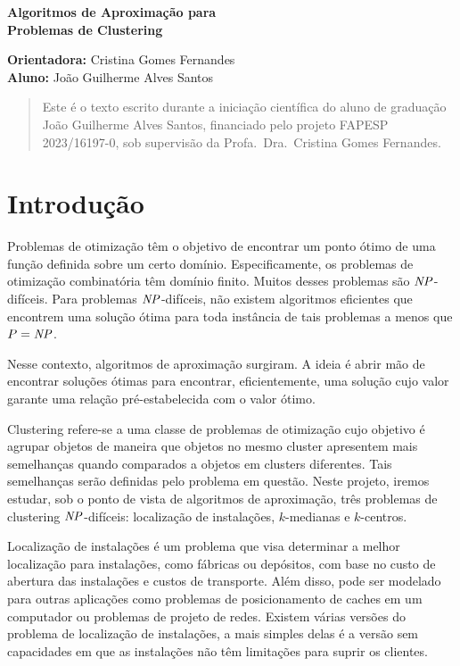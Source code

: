 \documentclass[12pt]{article}
\begin{document}
\begin{center}
  
{\Large {\bf Algoritmos de Aproximação para \\Problemas de Clustering}
}

\vspace{0.2cm}
{\small 
{\bf Orientadora:} Cristina Gomes Fernandes \\
{\bf Aluno:} João Guilherme Alves Santos
}

\vspace{5mm} 

\begin{abstract}
Este é o texto escrito durante a iniciação científica do aluno de graduação João Guilherme Alves Santos, financiado pelo projeto FAPESP 2023/16197-0, sob supervisão da Profa.\ Dra.\ Cristina Gomes Fernandes.
\end{abstract}

\end{center}
\newpage

\tableofcontents
\newpage

\section{Introdução}

Problemas de otimização têm o objetivo de encontrar um ponto ótimo de uma função definida sobre um certo domínio. Especificamente, os problemas de otimização combinatória têm domínio finito. Muitos desses problemas são $\mathit{NP}$-difíceis. Para problemas $\mathit{NP}$-difíceis, não existem algoritmos eficientes que encontrem uma solução ótima para toda instância de tais problemas a menos que $P = \mathit{NP}$.

Nesse contexto, algoritmos de aproximação surgiram. A ideia é abrir mão de encontrar soluções ótimas para encontrar, eficientemente, uma solução cujo valor garante uma relação pré-estabelecida com o valor ótimo. 

Clustering refere-se a uma classe de problemas de otimização cujo objetivo é agrupar objetos de maneira que objetos no mesmo cluster apresentem mais semelhanças quando comparados a objetos em clusters diferentes. Tais semelhanças serão definidas pelo problema em questão. Neste projeto, iremos estudar, sob o ponto de vista de algoritmos de aproximação, três problemas de clustering $\mathit{NP}$-difíceis: localização de instalações, $k$-medianas e $k$-centros. 

Localização de instalações é um problema que visa determinar a melhor localização para instalações, como fábricas ou depósitos, com base no custo de abertura das instalações e custos de transporte. Além disso, pode ser modelado para outras aplicações como problemas de posicionamento de caches em um computador ou problemas de projeto de redes.
Existem várias versões do problema de localização de instalações, a mais simples delas é a versão sem capacidades em que as instalações não têm limitações para suprir os clientes.
\end{document}
